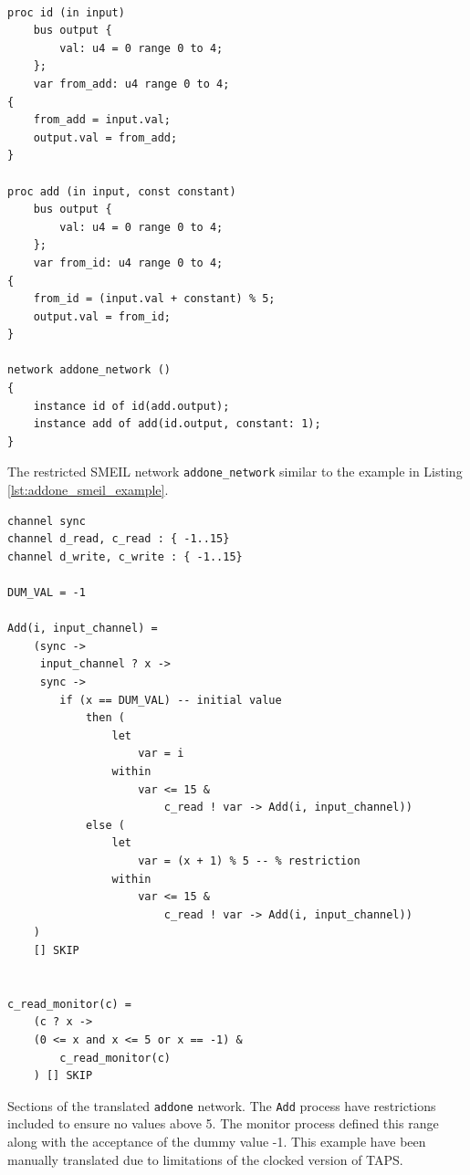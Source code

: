 \begin{listing}
\begin{verbatim}

proc id (in input)
    bus output {
        val: u4 = 0 range 0 to 4;
    };
    var from_add: u4 range 0 to 4;
{
    from_add = input.val;
    output.val = from_add;
}

proc add (in input, const constant)
    bus output {
        val: u4 = 0 range 0 to 4;
    };
    var from_id: u4 range 0 to 4;
{
    from_id = (input.val + constant) % 5;
    output.val = from_id;
}

network addone_network ()
{
    instance id of id(add.output);
    instance add of add(id.output, constant: 1);
}
\end{verbatim}
\caption{The restricted SMEIL network \texttt{addone\_network} similar to the example in Listing \ref{lst:addone_smeil_example}.}
\label{lst:addone_mod_example}
\end{listing}

\begin{listing}
\begin{verbatim}
channel sync
channel d_read, c_read : { -1..15}
channel d_write, c_write : { -1..15}

DUM_VAL = -1

Add(i, input_channel) =
    (sync ->
     input_channel ? x ->
     sync ->
        if (x == DUM_VAL) -- initial value
            then (
                let
                    var = i
                within
                    var <= 15 &
                        c_read ! var -> Add(i, input_channel))
            else (
                let
                    var = (x + 1) % 5 -- % restriction
                within
                    var <= 15 &
                        c_read ! var -> Add(i, input_channel))
    )
    [] SKIP


c_read_monitor(c) =
    (c ? x ->
    (0 <= x and x <= 5 or x == -1) &
        c_read_monitor(c)
    ) [] SKIP

\end{verbatim}
\caption{Sections of the translated \texttt{addone} network. The \texttt{Add} process have restrictions included to ensure no values above 5. The monitor process defined this range along with the acceptance of the dummy value -1. This example have been manually translated due to limitations of the clocked version of TAPS.}
\label{lst:cspm_addone_restricted}
\end{listing}
